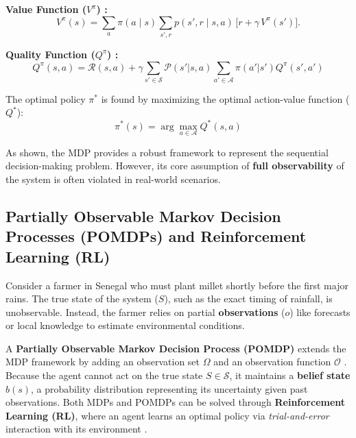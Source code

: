 \documentclass[conference]{IEEEtran}
\begin{document}
\textbf{Value Function ($V^{\pi}$) :}
\begin{equation}
V^{\pi}(s) = \sum_{a} \pi(a \mid s) \sum_{s',r} p(s',r \mid s,a)\,\bigl[r + \gamma \, V^{\pi}(s')\bigr].
\label{eq:V_pi}
\end{equation}

\textbf{Quality Function ($Q^{\pi}$) :}
\begin{equation}
Q^{\pi}(s, a) = \mathcal{R}(s, a) + \gamma \sum_{s' \in \mathcal{S}} \mathcal{P}(s'|s, a) \sum_{a' \in \mathcal{A}} \pi(a'|s') Q^{\pi}(s', a')
\label{eq:Q_pi}
\end{equation}

\noindent The optimal policy $\pi^{*}$ is found by maximizing the optimal action-value function ($Q^{*}$):
\begin{equation}
\pi^{*}(s) = \arg \max_{a \in \mathcal{A}} Q^{*}(s, a)
\label{eq:pi_star}
\end{equation}

As shown, the MDP provides a robust framework to represent the sequential decision-making problem. However, its core assumption of \textbf{full observability} of the system is often violated in real-world scenarios.

\subsection{Partially Observable Markov Decision Processes (POMDPs) and Reinforcement Learning (RL)}

Consider a farmer in Senegal who must plant millet shortly before the first major rains. The true state of the system ($S$), such as the exact timing of rainfall, is unobservable. Instead, the farmer relies on partial \textbf{observations} ($o$) like forecasts or local knowledge to estimate environmental conditions.

A \textbf{Partially Observable Markov Decision Process (POMDP)} extends the MDP framework by adding an observation set $\Omega$ and an observation function $\mathcal{O}$ \cite{kaelblingPlanningActingPartially1998}. Because the agent cannot act on the true state $S \in \mathcal{S}$, it maintains a \textbf{belief state} $b(s)$, a probability distribution representing its uncertainty given past observations. Both MDPs and POMDPs can be solved through \textbf{Reinforcement Learning (RL)}, where an agent learns an optimal policy via \textit{trial-and-error} interaction with its environment \cite{suttonReinforcementLearningIntroduction2014}.
\end{document}
